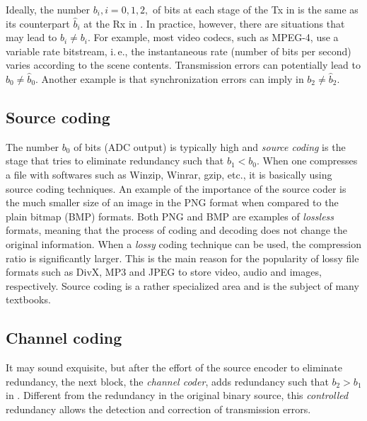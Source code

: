 
Ideally, the number $b_i, i=0,1,2,$ of bits at each stage of the Tx in  is the same as its counterpart $\hat b_i$ at the Rx in . In practice, however, there are situations that may lead to $\hat b_i \ne b_i$. For example, most video codecs, such as MPEG-4, use a variable rate bitstream, i.\,e., the instantaneous rate (number of bits per second) varies according to the scene contents. Transmission errors can potentially lead to $b_0 \ne \hat b_0$. Another example is that synchronization errors can imply in $b_2 \ne \hat b_2$.

\subsection{Source coding}
The number $b_0$ of bits (ADC output) is typically high and \emph{source coding} is the stage that tries to eliminate redundancy such that $b_1 < b_0$. When one compresses a file with softwares such as Winzip, Winrar, gzip, etc., it is basically using source coding techniques. An example of the importance of the source coder is the much smaller size of an image in the PNG format when compared to the plain bitmap (BMP) formats. Both PNG and BMP are examples of \emph{lossless} formats, meaning that the process of coding and decoding does not change the original information. When a \emph{lossy} coding technique can be used, the compression ratio is significantly larger. This is the main reason for the popularity of lossy file formats such as DivX, MP3 and JPEG to store video, audio and images, respectively. Source coding is a rather specialized area and is the subject of many textbooks.

\subsection{Channel coding}
It may sound exquisite, but after the effort of the source encoder to eliminate redundancy, the next block, the \emph{channel coder}, adds redundancy such that $b_2 > b_1$ in . Different from the redundancy in the original binary source, this \emph{controlled} redundancy allows the detection and correction of transmission errors.

